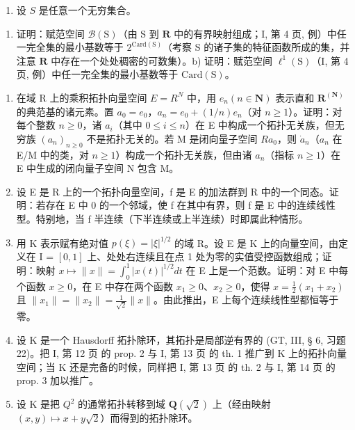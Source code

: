 \exercisegroup

\begin{enumerate}
\def\labelenumi{\arabic{enumi})}
\tightlist
\item
  设 \(S\) 是任意一个无穷集合。
\end{enumerate}

\begin{enumerate}
\def\labelenumi{\alph{enumi})}
\tightlist
\item
  证明：赋范空间 \(\mathcal{B}(\mathrm{S})\)（由 S 到 \(\mathbf{R}\) 中的有界映射组成；I, 第 4 页, 例）中任一完全集的最小基数等于 \(2^{\mathrm{Card}(\mathrm{S})}\)（考察 S 的诸子集的特征函数所成的集，并注意 \(\mathbf{R}\) 中存在一个处处稠密的可数集）。b) 证明：赋范空间 \(\ell^1 (\mathrm{S})\)（I, 第 4 页, 例）中任一完全集的最小基数等于 \(\mathrm{Card}(\mathrm{S})\)。
\end{enumerate}

\begin{enumerate}
\def\labelenumi{\arabic{enumi})}
\setcounter{enumi}{1}
\item
  在域 R 上的乘积拓扑向量空间 \(E = R^{N}\) 中，用 \(e_{n} (n \in \mathbf{N})\) 表示直和 \(\mathbf{R}^{(\mathbf{N})}\) 的典范基的诸元素。置 \(a_{0} = e_{0}\)，\(a_{n} = e_{0} + (1/n)e_{n}\)（对 \(n \geqslant 1\)）。证明：对每个整数 \(n \geqslant 0\)，诸 \(a_{i}\)（其中 \(0 \leqslant i \leqslant n\)）在 E 中构成一个拓扑无关族，但无穷族 \((a_{n})_{n \geqslant 0}\) 不是拓扑无关的。若 M 是闭向量子空间 \(Ra_{0}\)，则 \(\dot{a}_{n}\)（\(a_{n}\) 在 E/M 中的类，对 \(n \geqslant 1\)）构成一个拓扑无关族，但由诸 \(a_{n}\)（指标 \(n \geqslant 1\)）在 E 中生成的闭向量子空间 N 包含 M。
\item
  设 E 是 R 上的一个拓扑向量空间，f 是 E 的加法群到 R 中的一个同态。证明：若存在 E 中 0 的一个邻域，使 f 在其中有界，则 f 是 E 中的连续线性型。特别地，当 f 半连续（下半连续或上半连续）时即属此种情形。
\item
  用 K 表示赋有绝对值 \(p(\xi) = |\xi|^{1/2}\) 的域 R。设 E 是 K 上的向量空间，由定义在 I = \([0, 1]\) 上、处处右连续且在点 1 处为零的实值受控函数组成；证明：映射 \(x \mapsto \|x\| = \int_{0}^{1} |x(t)|^{1/2} dt\) 在 E 上是一个范数。证明：对 E 中每个函数 \(x \geqslant 0\)，在 E 中存在两个函数 \(x_{1} \geqslant 0\)、\(x_{2} \geqslant 0\)，使得 \(x = \frac{1}{2}(x_{1} + x_{2})\) 且 \(\|x_{1}\| = \|x_{2}\| = \frac{1}{\sqrt{2}} \|x\|\)。由此推出，E 上每个连续线性型都恒等于零。
\item
  设 K 是一个 Hausdorff 拓扑除环，其拓扑是局部逆有界的 (GT, III, § 6, 习题 22)。把 I, 第 12 页 的 prop. 2 与 I, 第 13 页 的 th. 1 推广到 K 上的拓扑向量空间；当 K 还是完备的时候，同样把 I, 第 13 页 的 th. 2 与 I, 第 14 页 的 prop. 3 加以推广。
\item
  设 K 是把 \(Q^{2}\) 的通常拓扑转移到域 \(\mathbf{Q}(\sqrt{2})\) 上（经由映射 \((x, y) \mapsto x + y\sqrt{2}\)）而得到的拓扑除环。
\end{enumerate}

